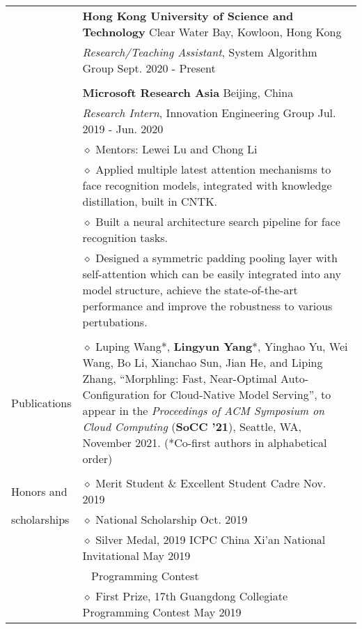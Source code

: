 \documentclass[letterpaper, 11pt]{article}
\begin{document}
\begin{longtable}{p{1.3in}p{4.8in}}
& {\textbf{Hong Kong University of Science and Technology}} \hfill Clear Water Bay, Kowloon, Hong Kong \\
& \textit{Research/Teaching Assistant}, System Algorithm Group \hfill Sept. 2020 - Present \\
& \\
 
& {\textbf{Microsoft Research Asia}} \hfill Beijing, China\\
& \textit{Research Intern}, Innovation Engineering Group \hfill Jul. 2019 - Jun. 2020 \\
& $\diamond$ Mentors: Lewei Lu and Chong Li \\
& $\diamond$ Applied multiple latest attention mechanisms to face recognition models, integrated with knowledge distillation, built in CNTK. \\
& $\diamond$ Built a neural architecture search pipeline for face recognition tasks. \\
& $\diamond$ Designed a symmetric padding pooling layer with self-attention which can be easily integrated into any model structure, achieve the state-of-the-art performance and improve the robustness to various pertubations. \\
& \\

\nohyphens{Publications}
& $\diamond$ Luping Wang*, \textbf{Lingyun Yang}*, Yinghao Yu, Wei Wang, Bo Li, Xianchao Sun, Jian He, and Liping Zhang, “Morphling: Fast, Near-Optimal Auto-Configuration for Cloud-Native Model Serving”, to appear in the \textit{Proceedings of ACM Symposium on Cloud Computing} (\textbf{SoCC ’21}), Seattle, WA, November 2021. (*Co-first authors in alphabetical order) \\
& \\

{Honors and }
& $\diamond$ Merit Student \& Excellent Student Cadre \hfill Nov. 2019 \\
{scholarships}
& $\diamond$ National Scholarship \hfill Oct. 2019 \\

& $\diamond$ Silver Medal, 2019 ICPC China Xi'an National Invitational \hfill May 2019 \\
& $\ \ $ Programming Contest \\

& $\diamond$ First Prize, 17th Guangdong Collegiate Programming Contest \hfill May 2019 \\


\end{longtable}
\end{document}
